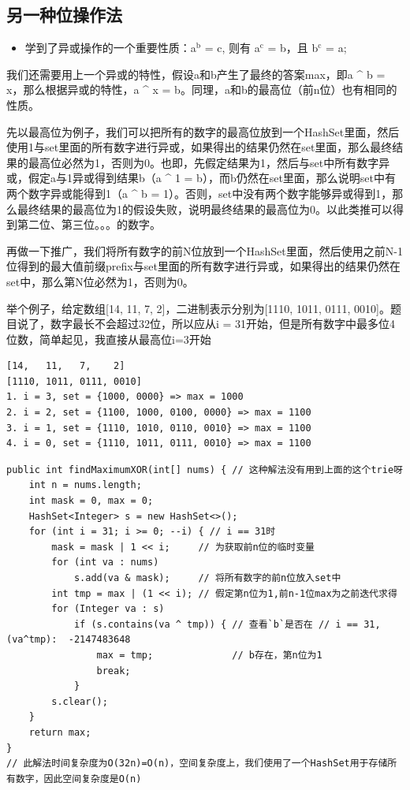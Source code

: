 \documentclass[9pt, b5paaper]{book}
\begin{document}
\subsection{另一种位操作法}
\label{sec-9-5-1}

\begin{itemize}
\item 学到了异或操作的一个重要性质：a$^{\text{b}}$ = c, 则有 a$^{\text{c}}$ = b，且 b$^{\text{c}}$ = a;
\end{itemize}

我们还需要用上一个异或的特性，假设a和b产生了最终的答案max，即a \^{} b = x，那么根据异或的特性，a \^{} x = b。同理，a和b的最高位（前n位）也有相同的性质。

先以最高位为例子，我们可以把所有的数字的最高位放到一个HashSet里面，然后使用1与set里面的所有数字进行异或，如果得出的结果仍然在set里面，那么最终结果的最高位必然为1，否则为0。也即，先假定结果为1，然后与set中所有数字异或，假定a与1异或得到结果b（a \^{} 1 = b），而b仍然在set里面，那么说明set中有两个数字异或能得到1（a \^{} b = 1）。否则，set中没有两个数字能够异或得到1，那么最终结果的最高位为1的假设失败，说明最终结果的最高位为0。以此类推可以得到第二位、第三位。。。的数字。

再做一下推广，我们将所有数字的前N位放到一个HashSet里面，然后使用之前N-1位得到的最大值前缀prefix与set里面的所有数字进行异或，如果得出的结果仍然在set中，那么第N位必然为1，否则为0。

举个例子，给定数组[14, 11, 7, 2]，二进制表示分别为[1110, 1011, 0111, 0010]。题目说了，数字最长不会超过32位，所以应从i = 31开始，但是所有数字中最多位4位数，简单起见，我直接从最高位i=3开始
\begin{verbatim}
[14,   11,   7,    2]
[1110, 1011, 0111, 0010]
1. i = 3, set = {1000, 0000} => max = 1000
2. i = 2, set = {1100, 1000, 0100, 0000} => max = 1100
3. i = 1, set = {1110, 1010, 0110, 0010} => max = 1100
4. i = 0, set = {1110, 1011, 0111, 0010} => max = 1100
\end{verbatim}
\begin{verbatim}
public int findMaximumXOR(int[] nums) { // 这种解法没有用到上面的这个trie呀
    int n = nums.length;
    int mask = 0, max = 0;
    HashSet<Integer> s = new HashSet<>();
    for (int i = 31; i >= 0; --i) { // i == 31时
        mask = mask | 1 << i;     // 为获取前n位的临时变量     
        for (int va : nums) 
            s.add(va & mask);     // 将所有数字的前n位放入set中
        int tmp = max | (1 << i); // 假定第n位为1,前n-1位max为之前迭代求得
        for (Integer va : s) 
            if (s.contains(va ^ tmp)) { // 查看`b`是否在 // i == 31, (va^tmp):  -2147483648
                max = tmp;              // b存在，第n位为1
                break;
            }
        s.clear();
    }
    return max;
}
// 此解法时间复杂度为O(32n)=O(n)，空间复杂度上，我们使用了一个HashSet用于存储所有数字，因此空间复杂度是O(n)
\end{verbatim}
\end{document}
